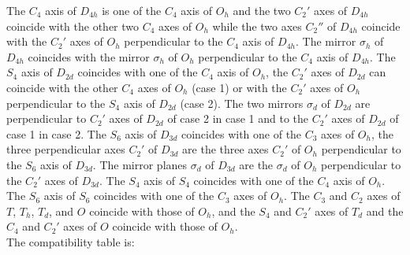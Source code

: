 \documentclass[12pt,a4paper]{article}
\begin{document}
The $C_4$ axis of $D_{4h}$ is
one of the $C_4$ axis of $O_h$ and the two $C_2'$ axes of $D_{4h}$ coincide 
with the other two $C_4$ axes of $O_h$ while the two axes $C_2''$ of $D_{4h}$ 
coincide with the $C_2'$ axes of $O_h$ perpendicular to the $C_4$ axis of 
$D_{4h}$.
The mirror $\sigma_h$ of $D_{4h}$ coincides with the mirror $\sigma_h$ of
$O_h$ perpendicular to the $C_4$ axis of $D_{4h}$.
The $S_4$ axis of $D_{2d}$ coincides with one of the $C_4$ axis of $O_h$,
the $C_2'$ axes of $D_{2d}$ can coincide with the other $C_4$ axes of 
$O_h$ (case 1) or with the $C_2'$ axes of $O_h$ perpendicular to the $S_4$ 
axis of $D_{2d}$ (case 2). The two mirrors $\sigma_d$ of $D_{2d}$ are 
perpendicular to $C_2'$ axes of $D_{2d}$ of case 2 in case 1 and to the $C_2'$
axes of $D_{2d}$ of case 1 in case 2.
The $S_6$ axis of $D_{3d}$ coincides with one of the $C_3$ axes
of $O_h$, the three perpendicular axes $C_2'$ of $D_{3d}$ are the three axes 
$C_2'$ of $O_h$ perpendicular to the $S_6$ axis of $D_{3d}$. The mirror planes 
$\sigma_d$ of $D_{3d}$ are the $\sigma_d$ of $O_h$ perpendicular to the $C_2'$ 
axes of $D_{3d}$.
The $S_4$ axis of $S_4$ coincides with one of the $C_4$ axis of $O_h$. 
The $S_6$ axis of $S_6$ coincides with one of the $C_3$ axes of $O_h$. 
The $C_3$ and $C_2$ axes of $T$, $T_h$, $T_d$, and
$O$ coincide with those of $O_h$, and the $S_4$ and $C_2'$ axes of $T_d$ and
the $C_4$ and $C_2'$ axes of $O$ coincide with those of $O_h$. \\
The compatibility table is:
\end{document}
